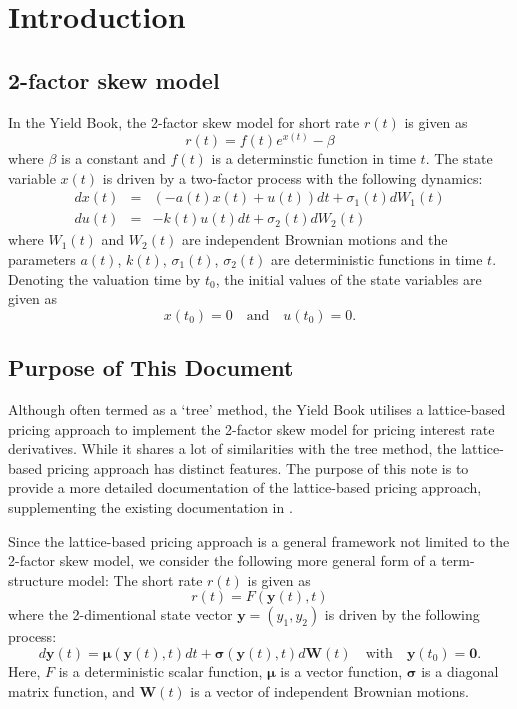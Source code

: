 \documentclass{texyise}
\begin{document}
\section{Introduction}

\subsection{2-factor skew model}

In the Yield Book, the 2-factor skew model for short rate $r(t)$ is given as
\begin{equation}
    r(t) = f(t) e^{x(t)} - \beta  \label{E:2fskew}
\end{equation}
where $\beta$ is a constant and $f(t)$ is a determinstic function in time $t$. The state variable $x(t)$ is driven by a two-factor process with the following dynamics:
\begin{eqnarray}
    dx(t) &=& (-a(t)x(t)+u(t))dt + \sigma_1(t) dW_1(t) \label{E:2fskew1} \\
    du(t) &=& -k(t)u(t)dt + \sigma_2(t) dW_2(t) \label{E:2fskew2}
\end{eqnarray}
where $W_1(t)$ and $W_2(t)$ are independent Brownian motions and the parameters $a(t)$, $k(t)$, $\sigma_1(t)$, $\sigma_2(t)$ are deterministic functions in time $t$.
Denoting the valuation time by $t_0$, the initial values of the state variables are given as
\begin{equation}
    x(t_0) = 0 \quad \text{and} \quad u(t_0) = 0.
\end{equation}

\subsection{Purpose of This Document}

Although often termed as a `tree' method, the Yield Book utilises a lattice-based pricing approach to implement the 2-factor skew model for pricing interest rate derivatives. While it shares a lot of similarities with the tree method, the lattice-based pricing approach has distinct features. The purpose of this note is to provide a more detailed documentation of the lattice-based pricing approach, supplementing the existing documentation in \cite{2fs-citi-mv}.

Since the lattice-based pricing approach is a general framework not limited to the 2-factor skew model, we consider the following more general form of a term-structure model: The short rate $r(t)$ is given as
\begin{equation}
    r(t) = F(\bm{y}(t), t) \label{E:short-rate-generic}
\end{equation}
where the 2-dimentional state vector $\bm{y} = (y_1, y_2)$ is driven by the following process:
\begin{equation}
    d\bm{y}(t) = \bm{\mu}(\bm{y}(t), t) dt + \bm{\sigma}(\bm{y}(t), t) d\bm{W}(t) 
    \quad\text{with}\quad \bm{y}(t_0) = \bm{0}.
    \label{E:state-variable-generic}
\end{equation}
Here, $F$ is a deterministic scalar function, $\bm{\mu}$ is a vector function, $\bm{\sigma}$ is a diagonal matrix function, and $\bm{W}(t)$ is a vector of independent Brownian motions.
\end{document}
